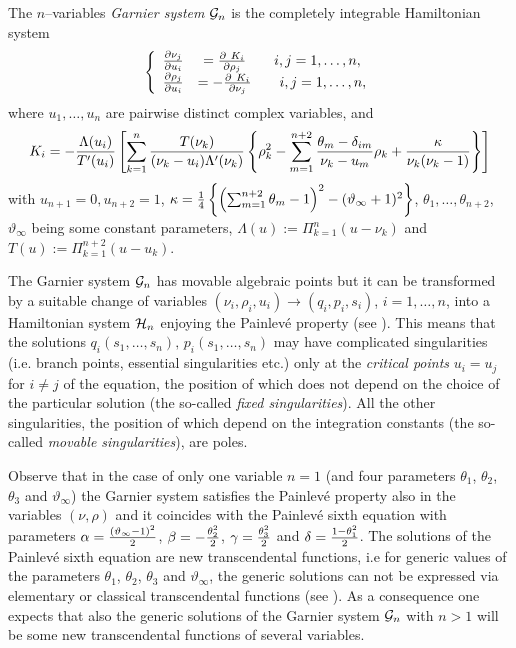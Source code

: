 \documentclass[12pt]{article}
\def\thi{{\vartheta_\infty}}
\theoremstyle{definition}
\theoremstyle{theorem}
\begin{document}
The $n$--variables {\it Garnier system}\/ ${\cal G}_n$ is the
completely integrable Hamiltonian system \cite{Gar1,Gar2,Ok1}
\begin{equation}
\left\{\begin{array}{cc}
{\partial\nu_j\over\partial u_i}&={\partial\
K_i\over\partial\rho_j}
\qquad i,j=1,\dots,n,\\
{\partial\rho_j\over\partial u_i}&=-{\partial\ K_i\over\partial\nu_j}
\qquad i,j=1,\dots,n,\\
\end{array}
\right.
\label{ga1}\end{equation}
where $u_1,\dots,u_n$ are pairwise distinct
complex variables, and 
\begin{equation}
K_i=-{\Lambda(u_i)\over T'(u_i)}\left[\sum_{k=1}^{n}
{T(\nu_k)\over(\nu_k-u_i)\Lambda'(\nu_k)}
\left\{\rho_k^2-
\sum_{m=1}^{n+2}{\theta_m-\delta_{im}\over\nu_k-u_m}\rho_k
+{\kappa\over\nu_k(\nu_k-1)}\right\}\right]
\label{ham}\end{equation}
with $u_{n+1}=0, u_{n+2}=1$, $\kappa={1\over4}\left\{ \left(
\sum_{m=1}^{n+2}\theta_m-1\right)^2-(\thi+1)^2\right\}$,
$\theta_1,\dots,\theta_{n+2}$, $\thi$ being some constant parameters, 
$\Lambda(u):=\Pi_{k=1}^{n}(u-\nu_k)$ and
$T(u):=\Pi_{k=1}^{n+2}(u-u_k)$.

The Garnier system ${\cal G}_n$ has movable algebraic points but it
can be transformed by a suitable change of variables 
$(\nu_i,\rho_i,u_i)\to(q_i,p_i,s_i)$, $i=1,\dots,n$,
into a Hamiltonian system ${\cal H}_n$ enjoying the 
Painlev\'e property (see \cite{KO}). This means that the solutions 
$q_i(s_1,\dots,s_n),\,p_i(s_1,\dots,s_n)$  may have 
complicated singularities (i.e. branch points, essential singularities etc.) 
only at the {\it critical points}\/ $u_i=u_j$ for $i\neq j$ of 
the equation, the position of which does not depend on the choice of
the particular solution 
(the so-called {\it fixed singularities}\/). All the other singularities, the
position of which depend on the integration constants (the so-called 
{\it movable singularities}\/), are poles.

Observe that in the case of only one variable $n=1$ (and four
parameters $\theta_1$, $\theta_2$, $\theta_3$ and $\thi$) the Garnier
system satisfies the Painlev\'e property also in the variables 
$(\nu,\rho)$ and it coincides with the Painlev\'e sixth equation with 
parameters $\alpha={(\thi-1)^2\over2}$, $\beta=-{\theta_2^2\over 2}$, 
$\gamma={\theta_3^2\over 2}$ and $\delta={1-\theta_1^2\over 2}$. 
The solutions of the Painlev\'e sixth equation are new transcendental 
functions, i.e for generic values of the parameters $\theta_1$, $\theta_2$,
$\theta_3$ and $\thi$, the generic solutions can not be expressed via 
elementary or classical transcendental functions 
(see \cite{Pain, Um1, Wat}). As a consequence one expects that also
the generic solutions of the Garnier system ${\cal G}_n$ with $n>1$
will be some new transcendental functions of several variables.
\end{document}
